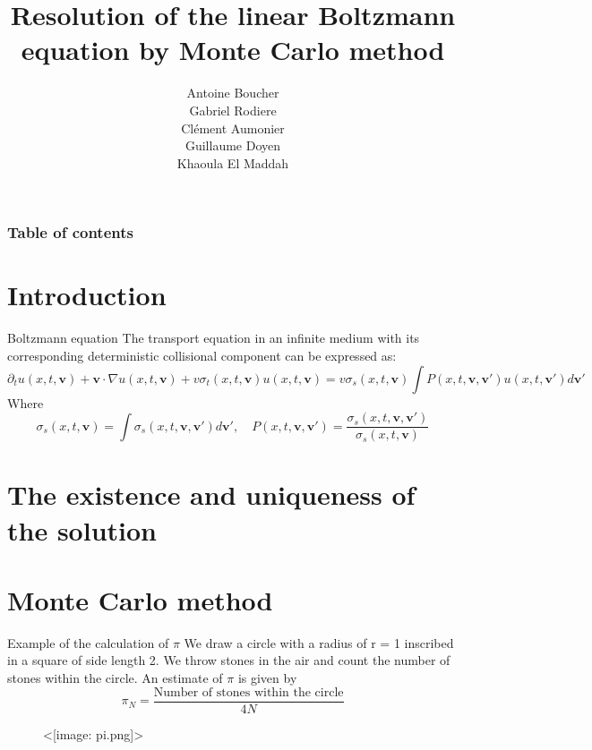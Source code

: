 \documentclass{beamer}
\title{ Resolution of the linear Boltzmann equation by Monte Carlo method}
\subtitle{}
\author{Antoine Boucher\\
	Gabriel Rodiere\\
	Clément Aumonier\\
	Guillaume Doyen\\
	Khaoula El Maddah}
\institute{}
\date{}
\def\texttt#1{<#1>}%
\begin{document}
	
	\begin{frame}
		\titlepage
	\end{frame}
	
	\begin{frame}
		\frametitle{Table of contents}
		\tableofcontents
	\end{frame}
	
	\section{Introduction}
	\begin{frame}{Boltzmann equation}
		The transport equation in an infinite medium with its corresponding deterministic collisional component can be expressed as:
		\begin{equation*}
			\partial _t u(x,t,\textbf{v}) + \textbf{v} \cdot \nabla u(x,t,\textbf{v}) + v\sigma_t (x,t,\textbf{v})u(x,t,\textbf{v})= v\sigma_s(x,t,\textbf{v})\int P (x,t,\textbf{v},\textbf{v}')u(x,t,\textbf{v}')d\textbf{v}' \label{ref11}
		\end{equation*}
		Where 
		\begin{equation*}
			\sigma_s (x,t,\textbf{v})= \int \sigma_s (x,t,\textbf{v},\textbf{v}')d\textbf{v}', \quad  P (x,t,\textbf{v},\textbf{v}')=
			\frac{\sigma_s (x,t,\textbf{v},\textbf{v}')}{\sigma_s (x,t,\textbf{v})}
		\end{equation*}
		
	\end{frame}
	\section{The existence and uniqueness of the solution}
	\section{Monte Carlo method}
	\begin{frame}{Example of the calculation of $\pi$}
		We draw a circle with a radius of r = 1 inscribed in a square of side length 2. We throw stones in the air and count the number of stones within the circle. An estimate of $\pi$ is given by 
		\begin{equation*}
			\pi_N =\frac{\text{Number of stones within the circle}}{4 N}
		\end{equation*}
		\begin{figure}[h]
			\centering
			\texttt{[image: pi.png]}
			\label{fig:votre_label}
		\end{figure}
	\end{frame}
\end{document}
